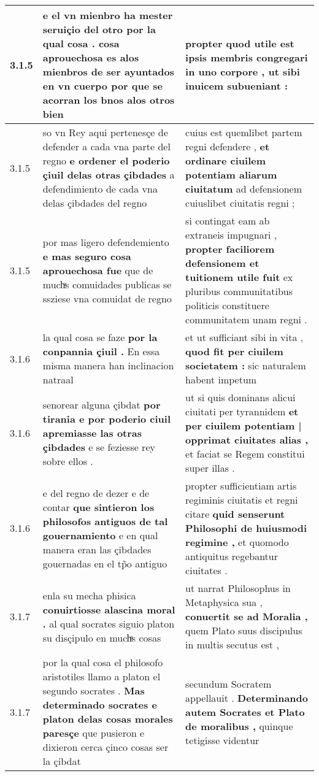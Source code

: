 \begin{tabular}{|p{1cm}|p{6.5cm}|p{6.5cm}|}
3.1.5 & e el vn mienbro ha mester seruiçio del otro por la qual cosa . \textbf{ cosa aprouechosa es alos mienbros de ser ayuntados en vn cuerpo } por que se acorran los bnos alos otros bien & propter quod utile est \textbf{ ipsis membris congregari in uno corpore , } ut sibi inuicem subueniant : \\\hline
3.1.5 & so vn Rey aqui pertenesçe de defender a cada vna parte del regno \textbf{ e ordener el poderio çiuil delas otras çibdades } a defendimiento de cada vna delas çibdades del regno & cuius est quemlibet partem regni defendere , \textbf{ et ordinare ciuilem potentiam aliarum ciuitatum } ad defensionem cuiuslibet ciuitatis regni ; \\\hline
3.1.5 & por mas ligero defendemiento \textbf{ e mas seguro cosa aprouechosa fue } que de muchͣs comuidades publicas se ssziese vna comuidat de regno & si contingat eam ab extraneis impugnari , \textbf{ propter faciliorem defensionem et tuitionem utile fuit } ex pluribus communitatibus politicis constituere communitatem unam regni . \\\hline
3.1.6 & la qual cosa se faze \textbf{ por la conpannia çiuil . } En essa misma manera han inclinacion natraal & et ut sufficiant sibi in vita , \textbf{ quod fit per ciuilem societatem : } sic naturalem habent impetum \\\hline
3.1.6 & senorear alguna çibdat \textbf{ por tirania e por poderio ciuil apremiasse las otras çibdades } e se feziesse rey sobre ellos . & ut si quis dominans alicui ciuitati per tyrannidem \textbf{ et per ciuilem potentiam | opprimat ciuitates alias , } et faciat se Regem constitui super illas . \\\hline
3.1.6 & e del regno de dezer e de contar \textbf{ que sintieron los philosofos antiguos de tal gouernamiento } e en qual manera eran las çibdades gouernadas en el tp̃o antiguo & propter sufficientiam artis regiminis ciuitatis et regni citare \textbf{ quid senserunt Philosophi de huiusmodi regimine , } et quomodo antiquitus regebantur ciuitates . \\\hline
3.1.7 & enla su mecha phisica \textbf{ conuirtiosse alascina moral . } al qual socrates siguio platon su disçipulo en muchͣs cosas & ut narrat Philosophus in Metaphysica sua , \textbf{ conuertit se ad Moralia , } quem Plato suus discipulus in multis secutus est , \\\hline
3.1.7 & por la qual cosa el philosofo aristotiles llamo a platon el segundo socrates . \textbf{ Mas determinado socrates e platon delas cosas morales paresçe } que pusieron e dixieron cerca çinco cosas ser la çibdat & secundum Socratem appellauit . \textbf{ Determinando autem Socrates et Plato de moralibus , } quinque tetigisse videntur \\\hline

\end{tabular}
